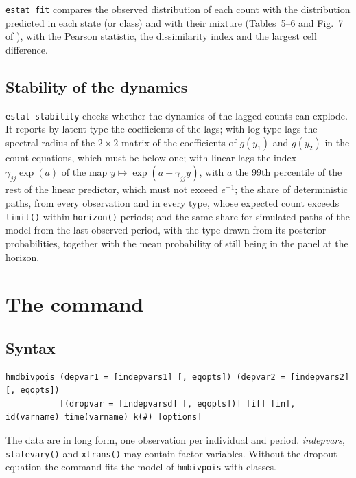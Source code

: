 \documentclass[11pt,a4paper]{article}
\newcommand{\cmd}[1]{\texttt{#1}}
\begin{document}
\cmd{estat fit} compares the observed distribution of each count with the distribution predicted in each
state (or class) and with their mixture (Tables~5--6 and Fig.~7 of \citealp{carrieri2026}), with the
Pearson statistic, the dissimilarity index and the largest cell difference.

\subsection{Stability of the dynamics}

\cmd{estat stability} checks whether the dynamics of the lagged counts can explode. It reports by latent
type the coefficients of the lags; with log-type lags the spectral radius of the $2\times2$ matrix of the
coefficients of $g(y_1)$ and $g(y_2)$ in the count equations, which must be below one; with linear lags
the index $\gamma_{jj}\exp(a)$ of the map $y\mapsto\exp(a+\gamma_{jj}y)$, with $a$ the 99th percentile of
the rest of the linear predictor, which must not exceed $e^{-1}$; the share of deterministic paths,
from every observation and in every type, whose expected count exceeds \cmd{limit()} within
\cmd{horizon()} periods; and the same share for simulated paths of the model from the last observed
period, with the type drawn from its posterior probabilities, together with the mean probability of
still being in the panel at the horizon.

\section{The command}\label{sec:command}

\subsection{Syntax}

\begin{lstlisting}
hmdbivpois (depvar1 = [indepvars1] [, eqopts]) (depvar2 = [indepvars2] [, eqopts])
           [(dropvar = [indepvarsd] [, eqopts])] [if] [in], id(varname) time(varname) k(#) [options]
\end{lstlisting}

The data are in long form, one observation per individual and period. \textit{indepvars},
\cmd{statevary()} and \cmd{xtrans()} may contain factor variables. Without the dropout equation the
command fits the model of \cmd{hmbivpois} with classes.
\end{document}
